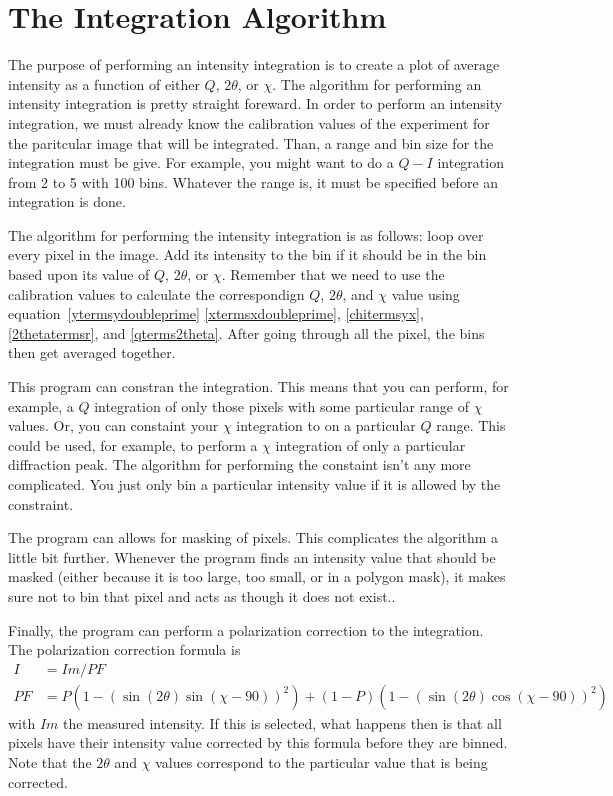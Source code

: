 \section{The Integration Algorithm}

The purpose of performing an intensity integration is 
to create a plot of average intensity as a function
of either $Q$, $2\theta$, or $\chi$. The algorithm
for performing an intensity integration is pretty
straight foreward. In order to perform an intensity
integration, we must already know the calibration values
of the experiment for the paritcular image that will
be integrated. Than, a range and bin size for the
integration must be give. For example, you might
want to do a $Q-I$ integration from 2 to 5 with
100 bins. Whatever the range is, it 
must be specified before an integration is done.

The algorithm for performing the intensity integration
is as follows: loop over every pixel in the image. 
Add its intensity to the bin if it should be
in the bin based upon its value of $Q$, $2\theta$, or 
$\chi$. Remember that we need to use the calibration
values to calculate the correspondign $Q$, $2\theta$, and 
$\chi$ value using equation~\ref{ytermsydoubleprime}
\ref{xtermsxdoubleprime}, \ref{chitermsyx}, 
\ref{2thetatermsr}, and \ref{qterms2theta}.
After going through all the pixel, the bins then get averaged 
together. 

This program can constran the integration. 
This means that you can perform, for example,
a $Q$ integration of only those pixels with some
particular range of $\chi$ values. Or, you can
constaint your $\chi$ integration to on a particular
$Q$ range. This could be used, for example, to
perform a $\chi$ integration of only a particular
diffraction peak. The algorithm for performing
the constaint isn't any more complicated. You just
only bin a particular intensity value if it is
allowed by the constraint.

The program can allows for masking of pixels.
This complicates the algorithm a little bit further.
Whenever the program finds an intensity value
that should be masked (either because it is too 
large, too small, or in a polygon mask), it makes
sure not to bin that pixel and acts as though
it does not exist..

Finally, the program can perform a polarization 
correction to the integration. The polarization 
correction formula is
\begin{align}
    I&=Im/PF \\ 
    PF&=P(1 - (\sin(2\theta)\sin(\chi-90))^2) + 
    (1 - P)(1 - (\sin(2\theta)\cos(\chi-90))^2)
\end{align}
with $Im$ the measured intensity. If this
is selected, what happens
then is that all pixels have their intensity
value corrected by this formula before they
are binned. Note that the $2\theta$ and $\chi$
values correspond to the particular value
that is being corrected.

